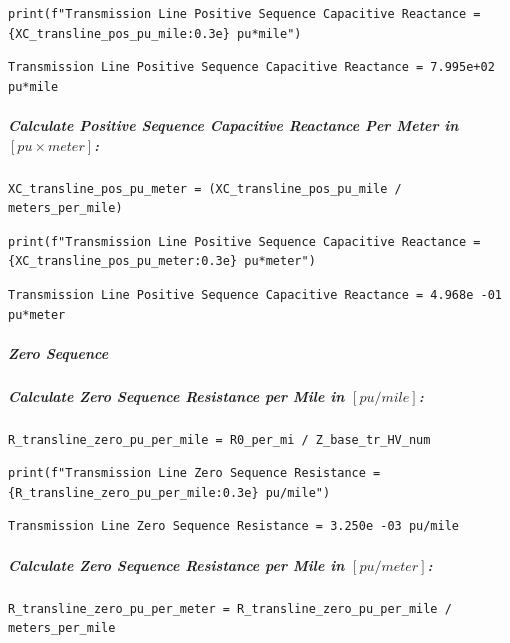 \begin{verbatim}
print(f"Transmission Line Positive Sequence Capacitive Reactance = {XC_transline_pos_pu_mile:0.3e} pu*mile")
\end{verbatim}

\begin{verbatim}
Transmission Line Positive Sequence Capacitive Reactance = 7.995e+02 pu*mile
\end{verbatim}

\subparagraph{Calculate Positive Sequence Capacitive Reactance Per Meter in $\left[pu \times meter\right]$:}

\begin{verbatim}
XC_transline_pos_pu_meter = (XC_transline_pos_pu_mile / meters_per_mile)
\end{verbatim}

\begin{verbatim}
print(f"Transmission Line Positive Sequence Capacitive Reactance = {XC_transline_pos_pu_meter:0.3e} pu*meter")
\end{verbatim}

\begin{verbatim}
Transmission Line Positive Sequence Capacitive Reactance = 4.968e -01 pu*meter
\end{verbatim}

\subparagraph{Zero Sequence}

\subparagraph{Calculate Zero Sequence Resistance per Mile in $\left[pu/mile\right]$:}

\begin{verbatim}
R_transline_zero_pu_per_mile = R0_per_mi / Z_base_tr_HV_num
\end{verbatim}

\begin{verbatim}
print(f"Transmission Line Zero Sequence Resistance = {R_transline_zero_pu_per_mile:0.3e} pu/mile")
\end{verbatim}

\begin{verbatim}
Transmission Line Zero Sequence Resistance = 3.250e -03 pu/mile
\end{verbatim}

\subparagraph{Calculate Zero Sequence Resistance per Mile in $\left[pu/meter\right]$:}

\begin{verbatim}
R_transline_zero_pu_per_meter = R_transline_zero_pu_per_mile / meters_per_mile
\end{verbatim}


